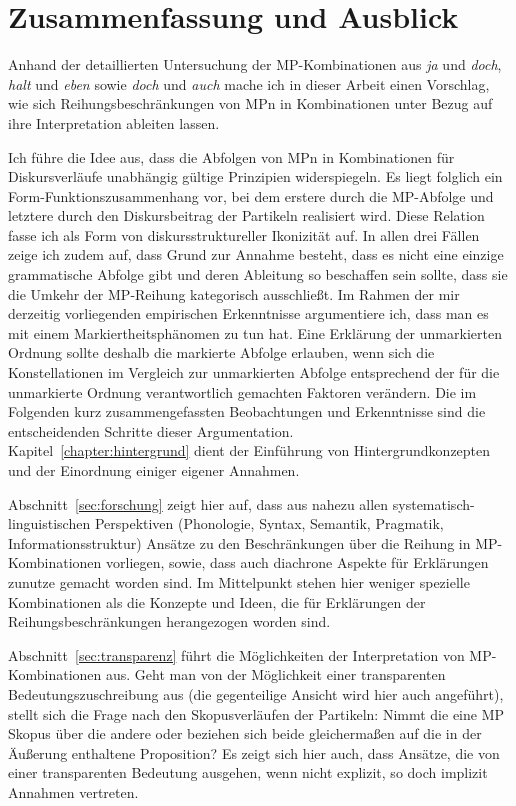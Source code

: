 \chapter{Zusammenfassung und Ausblick}
\label{chapter:schluss}
Anhand der detaillierten Untersuchung der MP-Kombinationen aus \textit{ja} und \textit{doch}, \textit{halt} und \textit{eben} sowie \textit{doch} und \textit{auch} mache ich in dieser Arbeit einen Vorschlag, wie sich Reihungsbeschränkungen von MPn in Kombinationen unter Bezug auf ihre Interpretation ableiten lassen.

Ich führe die Idee aus, dass die Abfolgen von MPn in Kombinationen für Diskurs\-verläufe unabhängig gültige Prinzipien widerspiegeln. Es liegt folglich ein Form-Funktionszusammenhang vor, bei dem erstere durch die MP-Abfolge und letztere durch den Diskursbeitrag der Partikeln realisiert wird. Diese Relation fasse ich als Form von diskursstruktureller Ikonizität  auf. In allen drei Fällen zeige ich zudem auf, dass Grund zur Annahme besteht, dass es nicht eine einzige grammatische Abfolge gibt und deren Ableitung so beschaffen sein sollte, dass sie die Umkehr der MP-Reihung kategorisch ausschließt. Im Rahmen der mir derzeitig vorliegenden empirischen Erkenntnisse argumentiere ich, dass man es mit einem Markiertheitsphänomen  zu tun hat. Eine Erklärung der unmarkierten Ordnung sollte deshalb die markierte Abfolge erlauben, wenn sich die Konstellationen im Vergleich zur unmarkierten Abfolge entsprechend der für die unmarkierte Ordnung verantwortlich gemachten Faktoren verändern. Die im Folgenden kurz zusammengefassten Beobachtungen und Erkenntnisse sind die entscheidenden Schritte dieser Argumentation.\\

\noindent
Kapitel~\ref{chapter:hintergrund} dient der Einführung von Hintergrundkonzepten und der Einordnung einiger eigener Annahmen. 

Abschnitt~\ref{sec:forschung} zeigt hier auf, dass aus nahezu allen systematisch-linguistischen Per\-spektiven (Phonologie, Syntax, Semantik, Pragmatik, Informationsstruktur) Ansätze zu den Beschränkungen über die Reihung in MP-Kombinationen vorliegen, sowie, dass auch diachrone  Aspekte für Erklärungen zunutze gemacht worden sind. Im Mittelpunkt stehen hier weniger spezielle Kombinationen als die Konzep\-te und Ideen, die für Erklärungen der Reihungsbeschränkungen herangezogen worden sind. 

Abschnitt~\ref{sec:transparenz} führt die Möglichkeiten der Interpretation von MP-Kombinationen aus. Geht man von der Möglichkeit einer transparenten Bedeutungszuschreibung aus (die gegenteilige Ansicht wird hier auch angeführt), stellt sich die Frage nach den Skopusverläufen  der Partikeln: Nimmt die eine MP Skopus über die andere oder beziehen sich beide gleichermaßen auf die in der Äußerung enthaltene Proposition? Es zeigt sich hier auch, dass Ansätze, die von einer transparenten Bedeutung ausgehen, wenn nicht explizit, so doch implizit Annahmen vertreten. 

